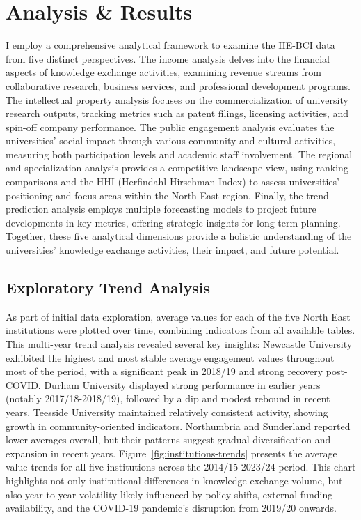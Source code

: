 \documentclass[journal,onecolumn, 10pt,draftclsnofoot]{IEEEtran}
\begin{document}
\section{Analysis \& Results}
\label{sec:analysis-results}

I employ a comprehensive analytical framework to examine the HE-BCI data from five distinct perspectives. The income analysis delves into the financial aspects of knowledge exchange activities, examining revenue streams from collaborative research, business services, and professional development programs. The intellectual property analysis focuses on the commercialization of university research outputs, tracking metrics such as patent filings, licensing activities, and spin-off company performance. The public engagement analysis evaluates the universities' social impact through various community and cultural activities, measuring both participation levels and academic staff involvement. The regional and specialization analysis provides a competitive landscape view, using ranking comparisons and the HHI (Herfindahl-Hirschman Index) to assess universities' positioning and focus areas within the North East region. Finally, the trend prediction analysis employs multiple forecasting models to project future developments in key metrics, offering strategic insights for long-term planning. Together, these five analytical dimensions provide a holistic understanding of the universities' knowledge exchange activities, their impact, and future potential.

\subsection{Exploratory Trend Analysis}

As part of initial data exploration, average values for each of the five North East institutions were plotted over time, combining indicators from all available tables. This multi-year trend analysis revealed several key insights: Newcastle University exhibited the highest and most stable average engagement values throughout most of the period, with a significant peak in 2018/19 and strong recovery post-COVID. Durham University displayed strong performance in earlier years (notably 2017/18-2018/19), followed by a dip and modest rebound in recent years. Teesside University maintained relatively consistent activity, showing growth in community-oriented indicators. Northumbria and Sunderland reported lower averages overall, but their patterns suggest gradual diversification and expansion in recent years. Figure~\ref{fig:institutions-trends} presents the average value trends for all five institutions across the 2014/15-2023/24 period. This chart highlights not only institutional differences in knowledge exchange volume, but also year-to-year volatility likely influenced by policy shifts, external funding availability, and the COVID-19 pandemic's disruption from 2019/20 onwards.
\end{document}
